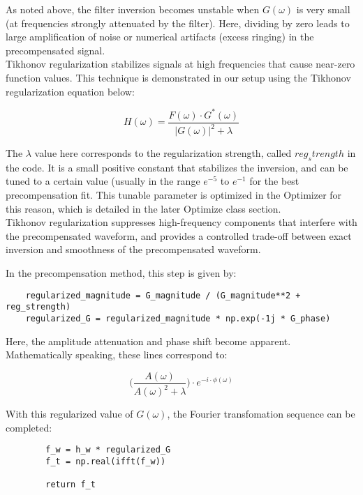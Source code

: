 \documentclass[11pt, a4paper]{article}
\theoremstyle{definition}
\numberwithin{equation}{section}
\begin{document}
As noted above, the filter inversion becomes unstable when $G(\omega)$ is very small (at frequencies strongly attenuated by the filter). Here, dividing by zero leads to large amplification of noise or numerical artifacts (excess ringing) in the precompensated signal.
\\
Tikhonov regularization stabilizes signals at high frequencies that cause near-zero function values. This technique is demonstrated in our setup using the Tikhonov regularization equation below:

\begin{equation}
    H(\omega) = \dfrac{F(\omega) \cdot G^*(\omega)}{|G(\omega)|^2 + \lambda}
\end{equation}

The $\lambda$ value here corresponds to the regularization strength, called $reg_strength$ in the code. It is a small positive constant that stabilizes the inversion, and can be tuned to a certain value (usually in the range $e^{-5}$ to $e^{-1}$ for the best precompensation fit. This tunable parameter is optimized in the Optimizer for this reason, which is detailed in the later Optimize class section.
\\
Tikhonov regularization suppresses high-frequency components that interfere with the precompensated waveform, and provides a controlled trade-off between exact inversion and smoothness of the precompensated waveform.

In the precompensation method, this step is given by:

\begin{verbatim}
    regularized_magnitude = G_magnitude / (G_magnitude**2 + reg_strength)
    regularized_G = regularized_magnitude * np.exp(-1j * G_phase)
\end{verbatim}

Here, the amplitude attenuation and phase shift become apparent. Mathematically speaking, these lines correspond to:

\begin{equation}
    \biggr( \dfrac{A(\omega)}{A(\omega)^2 + \lambda} \biggr) \cdot e^{-i \cdot \phi(\omega)}
\end{equation}

With this regularized value of $G(\omega)$, the Fourier transfomation sequence can be completed:

\begin{verbatim}
        f_w = h_w * regularized_G
        f_t = np.real(ifft(f_w))

        return f_t
\end{verbatim}
\end{document}
